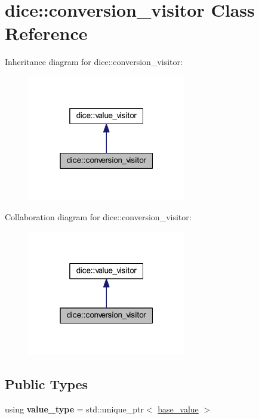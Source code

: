 \hypertarget{classdice_1_1conversion__visitor}{}\section{dice\+:\+:conversion\+\_\+visitor Class Reference}
\label{classdice_1_1conversion__visitor}


Inheritance diagram for dice\+:\+:conversion\+\_\+visitor\+:\nopagebreak
\begin{figure}[H]
\begin{center}
\leavevmode
\includegraphics[width=196pt]{classdice_1_1conversion__visitor__inherit__graph}
\end{center}
\end{figure}


Collaboration diagram for dice\+:\+:conversion\+\_\+visitor\+:\nopagebreak
\begin{figure}[H]
\begin{center}
\leavevmode
\includegraphics[width=196pt]{classdice_1_1conversion__visitor__coll__graph}
\end{center}
\end{figure}
\subsection*{Public Types}
\begin{DoxyCompactItemize}
\item 
\mbox{\label{classdice_1_1conversion__visitor_ac5411140c63f70a70f216437175627c2}} 
using {\bfseries value\+\_\+type} = std\+::unique\+\_\+ptr$<$ \mbox{\hyperlink{classdice_1_1base__value}{base\+\_\+value}} $>$
\end{DoxyCompactItemize}
